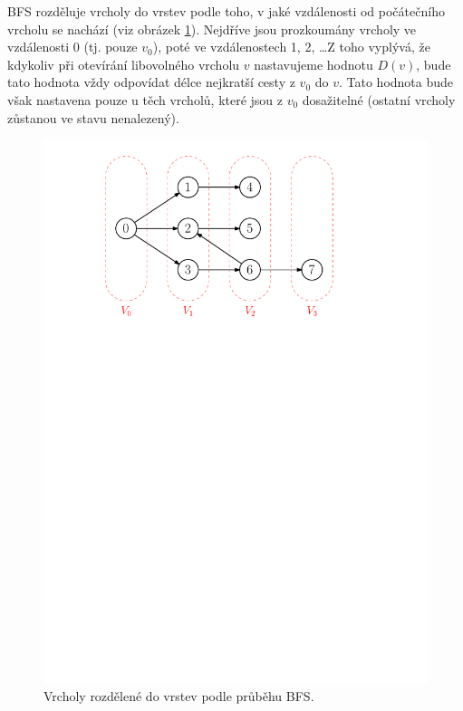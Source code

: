 BFS rozděluje vrcholy do vrstev podle toho, v jaké vzdálenosti od počátečního vrcholu se nachází (viz obrázek \ref{fig:bfs_vrstvy}). Nejdříve jsou prozkoumány vrcholy ve vzdálenosti 0 (tj. pouze $v_0$), poté ve vzdálenostech 1, 2, \dots Z toho vyplývá, že kdykoliv při otevírání libovolného vrcholu $v$ nastavujeme hodnotu $D(v)$, bude tato hodnota vždy odpovídat délce nejkratší cesty z $v_0$ do $v$. Tato hodnota bude však nastavena pouze u těch vrcholů, které jsou z $v_0$ dosažitelné (ostatní vrcholy zůstanou ve stavu nenalezený).
\begin{figure}[h]
    \centering
    \includegraphics[scale=.75]{01-grafalgo/images/ch01_bfs_vrstvy.pdf}
    \caption{Vrcholy rozdělené do vrstev podle průběhu BFS.}
    \label{fig:bfs_vrstvy}
\end{figure}

